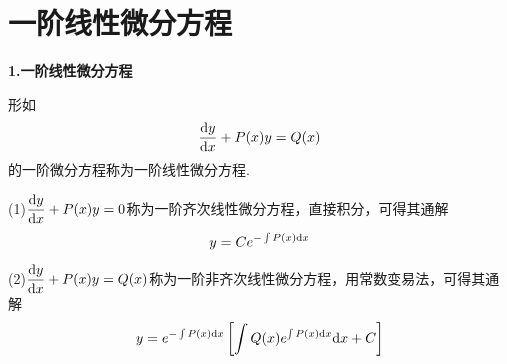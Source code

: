 \section{一阶线性微分方程}
\textbf{1.一阶线性微分方程}

形如
\begin{equation*}
    \dfrac{\mathrm{d} y}{\mathrm{d} x}+P(x)y=Q(x)
\end{equation*}
的一阶微分方程称为一阶线性微分方程.

\vspace{2mm}
(1)$\dfrac{\mathrm{d} y}{\mathrm{d} x}+P(x)y=0$称为一阶齐次线性微分方程，直接积分，可得其通解
\begin{equation*}
    y=Ce^{-\int P(x)\mathrm{d} x}
\end{equation*}

(2)$\dfrac{\mathrm{d} y}{\mathrm{d} x}+P(x)y=Q(x)$称为一阶非齐次线性微分方程，用常数变易法，可得其通解
\begin{equation*}
    y=e^{-\int P(x)\mathrm{d} x}\left[\int Q(x)e^{\int P(x)\mathrm{d} x}\mathrm{d} x+C\right]
\end{equation*}

